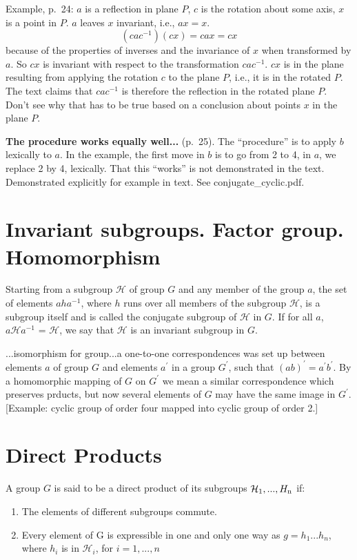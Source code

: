\documentclass{book}
\begin{document}
Example, p.\ 24: $a$ is a reflection in plane $P$, $c$ is the rotation
about some axis, $x$ is a point in $P$. $a$ leaves $x$ invariant,
i.e., $ax = x$.
$$
(cac^{-1})(cx) = cax = cx
$$ because of the properties of inverses and the invariance of $x$
when transformed by $a$. So $cx$ is invariant with respect to the
transformation $cac^{-1}$. $cx$ is in the plane resulting from
applying the rotation $c$ to the plane $P$, i.e., it is in the rotated
$P$. The text claims that $cac^{-1}$ is therefore the reflection in
the rotated plane $P$. Don't see why that has to be true based on a
conclusion about points $x$ in the plane $P$.

{\bf The procedure works equally well...} (p.\ 25). The ``procedure''
is to apply $b$ lexically to $a$. In the example, the first move in $b$
is to go from 2 to 4, in $a$, we replace 2 by 4, lexically. That this
``works'' is not demonstrated in the text. Demonstrated explicitly for example in text. See conjugate\_cyclic.pdf.

\section{Invariant subgroups. Factor group. Homomorphism}

Starting from a subgroup $\mathcal H$ of group $G$ and any member of
the group $a$, the set of elements $aha^{-1}$, where $h$ runs over all
members of the subgroup $\mathcal H$, is a subgroup itself and is
called the conjugate subgroup of $\mathcal H$ in $G$. If for all $a$,
$a{\mathcal H} a^{-1}$ = $\mathcal H$, we say that $\mathcal H$ is an
invariant subgroup in $G$.

...isomorphism for group...a one-to-one correspondences was set up
between elements $a$ of group $G$ and elements $a^\prime$ in a group
$G^\prime$, such that $(ab)^\prime = a^\prime b^\prime$. By a
homomorphic mapping of $G$ on $G^\prime$ we mean a similar
correspondence which preserves prducts, but now several elements of
$G$ may have the same image in $G^\prime$. [Example: cyclic group of
  order four mapped into cyclic group of order 2.]

\section{Direct Products}

A group $G$ is said to be a direct product of its subgroups ${\mathcal
  H_{\rm 1},...,H_{\rm n}}$ if:

\begin{enumerate}
\item The elements of different subgroups commute.
\item Every element of G is expressible in one and only one way as
  $g = h_1...h_n$, where $h_i$ is in ${\mathcal H}_i$, for $i = 1,...,n$
\end{enumerate}
\end{document}
